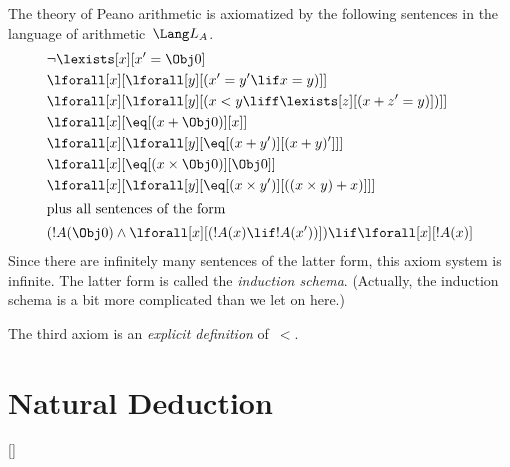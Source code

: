 \begin{ex}
The theory of Peano arithmetic is axiomatized by the following
sentences in the language of arithmetic~$\Lang L_A$.
\begin{align*}
& \lnot\lexists[x][x' = \Obj 0]\\
& \lforall[x][\lforall[y][(x' = y' \lif x = y)]]\\
& \lforall[x][\lforall[y][(x < y \liff \lexists[z][(x + z' = y)])]]\\
& \lforall[x][\eq[(x + \Obj 0)][x]]\\
& \lforall[x][\lforall[y][\eq[(x + y')][(x + y)']]]\\
& \lforall[x][\eq[(x \times \Obj 0)][\Obj 0]]\\
& \lforall[x][\lforall[y][\eq[(x \times y')][((x \times y) + x)]]]\\
\intertext{plus all sentences of the form}
& (!A(\Obj 0) \land \lforall[x][(!A(x) \lif !A(x'))]) \lif \lforall[x][!A(x)]
\end{align*}
Since there are infinitely many sentences of the latter form, this
axiom system is infinite.  The latter form is called the
\emph{induction schema}. (Actually, the induction schema is a bit more
complicated than we let on here.)

The third axiom is an \emph{explicit definition} of~$<$.
\end{ex}

\OLEndChapterHook

\chapter{Natural Deduction}

[\nosection]





\OLEndChapterHook


\stopproblems
\def\ifproblems#1{}

\def\captionnamefont{\sffamily\color{leadbeater}}
\def\captiontitlefont{\sffamily\color{leadbeater}}

\def\figurename{Fig.}
\setlength{\olphotowidth}{.45\textwidth}

